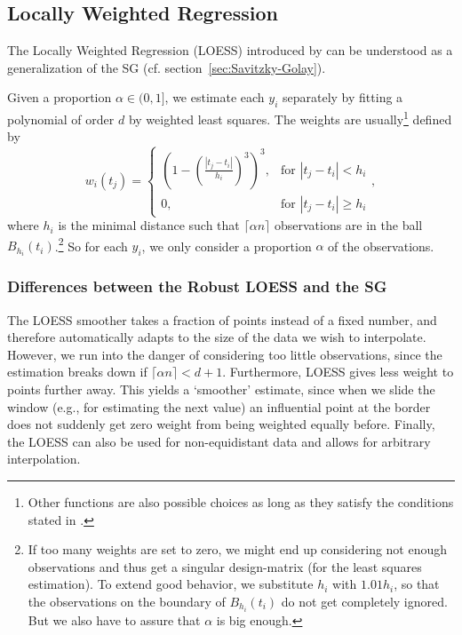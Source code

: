 	\subsection{Locally Weighted Regression}
		\label{sec:loess}

		The Locally Weighted Regression (LOESS) introduced by \cite{clevelandRobustLocallyWeighted1979} can be understood as a generalization of the SG (cf. section~\ref{sec:Savitzky-Golay}).

		Given a proportion $\alpha \in (0,1]$, we estimate each $y_i$ separately by fitting a polynomial of order $d$ by weighted least squares. The weights are usually\footnote{Other functions are also possible choices as long as they satisfy the conditions stated in \cite{clevelandRobustLocallyWeighted1979}.} defined by
		$$w_i(t_j)=\begin{cases}
				\left(1-\left(\frac{|t_j-t_i|}{h_i}\right)^{3}\right)^{3}, & \text{for } |t_j-t_i|<h_i           \\
				0,                                                   & \text{for } |t_j-t_i| \geqslant h_i
			\end{cases} ,$$
		where $h_i$ is the minimal distance such that $\lceil \alpha n\rceil$ observations are in the ball $B_{h_i}(t_i)$.\footnote{\label{footnote:LOESS}If too many weights are set to zero, we might end up considering not enough observations and thus get a singular design-matrix (for the least squares estimation). To extend good behavior, we substitute $h_i$ with $1.01 h_i$, so that the observations on the boundary of $B_{h_i}(t_i)$ do not get completely ignored. But we also have to assure that $\alpha$ is big enough.} So for each $y_i$, we only consider a proportion $\alpha$ of the observations.

		\subsubsection{Differences between the Robust LOESS and the SG}
		The LOESS smoother takes a fraction of points instead of a fixed number, and therefore automatically adapts to the size of the data we wish to interpolate. However, we run into the danger of considering too little observations, since the estimation breaks down if $\lceil \alpha n\rceil < d+1$.
		Furthermore, LOESS gives less weight to points further away. This yields a `smoother' estimate, since when we slide the window (e.g., for estimating the next value) an influential point at the border does not suddenly get zero weight from being weighted equally before.
		Finally, the LOESS can also be used for non-equidistant data and allows for arbitrary interpolation.

